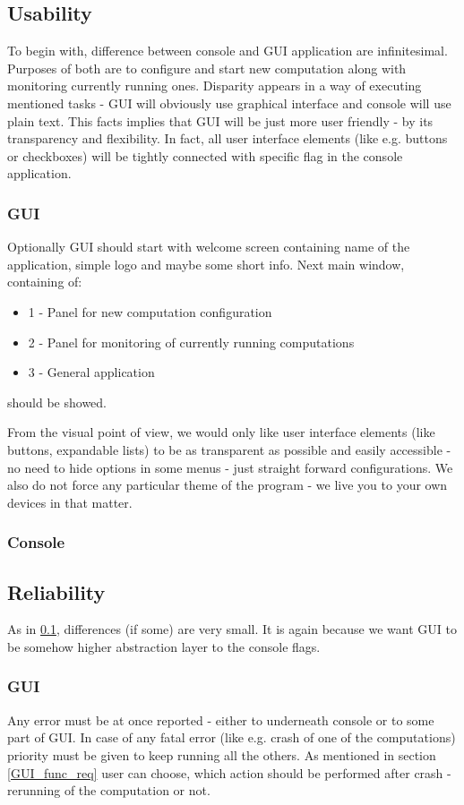 \documentclass{article}
\begin{document}
\subsection{Usability} \label{usability}
To begin with, difference between console and GUI application are infinitesimal. Purposes of both are to configure and start new computation along with monitoring currently running ones.
Disparity appears in a way of executing mentioned tasks - GUI will obviously use graphical interface and console will use plain text. This facts implies that GUI will be just more user friendly - by its transparency and flexibility. In fact, all user interface elements (like e.g. buttons or checkboxes) will be tightly connected with specific flag in the console application.

\subsubsection{GUI}
Optionally GUI should start with welcome screen containing name of the application, simple logo and maybe some short info. Next main window, containing of:
\begin{itemize} 
\item 1 - Panel for new computation configuration
\item 2 - Panel for monitoring of currently running computations
\item 3 - General application 
\end{itemize} 
should be showed. 

From the visual point of view, we would only like user interface elements (like buttons, expandable lists) to be as transparent as possible and easily accessible - no need to hide options in some menus - just straight forward configurations. We also do not force any particular theme of the program - we live you to your own devices in that matter.

\subsubsection{Console}

%
%
\subsection{Reliability}
As in \ref{usability}, differences (if some) are very small. It is again because we want GUI to be somehow higher abstraction layer to the console flags.

\subsubsection{GUI}
Any error must be at once reported - either to underneath console or to some part of GUI. In case of any fatal error (like e.g. crash of one of the computations) priority must be given to keep running all the others. As mentioned in section \ref{GUI_func_req} user can choose, which action should be performed after crash - rerunning of the computation or not. 
\end{document}
